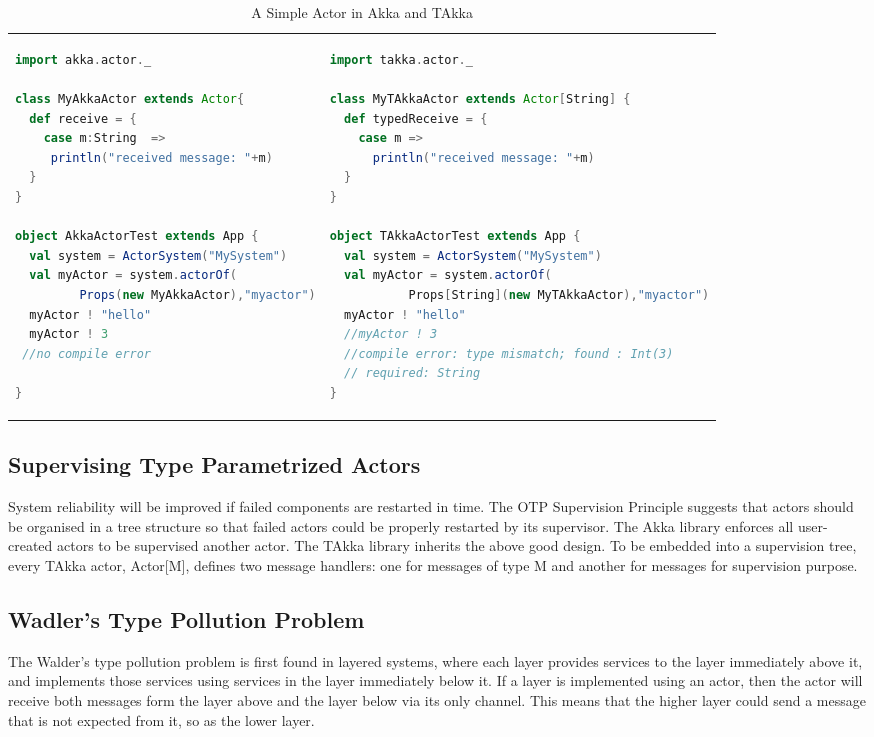 \begin{table}[h]
\label{first_actor}
  \begin{adjustwidth}{-0.5cm}{}
  \begin{tabular}{ l l }
      \begin{lstlisting}[language=scala]
import akka.actor._

class MyAkkaActor extends Actor{
  def receive = {
    case m:String  =>
     println("received message: "+m)
  }
}

object AkkaActorTest extends App {
  val system = ActorSystem("MySystem")
  val myActor = system.actorOf(
         Props(new MyAkkaActor),"myactor")
  myActor ! "hello"
  myActor ! 3
 //no compile error

}
      \end{lstlisting}
&
      \begin{lstlisting}[language=scala]
import takka.actor._

class MyTAkkaActor extends Actor[String] {
  def typedReceive = {
    case m =>
      println("received message: "+m)
  }
}

object TAkkaActorTest extends App {
  val system = ActorSystem("MySystem")
  val myActor = system.actorOf(
           Props[String](new MyTAkkaActor),"myactor")
  myActor ! "hello"
  //myActor ! 3
  //compile error: type mismatch; found : Int(3)
  // required: String
}
      \end{lstlisting}
  \end{tabular}
  \caption{A Simple Actor in Akka and TAkka}
  \end{adjustwidth}
  \label{my_table}
\end{table}


\subsection{Supervising Type Parametrized Actors}
System reliability will be improved if failed components are restarted in time. The OTP Supervision Principle suggests that actors should be organised in a tree structure so that failed actors could be properly restarted by its supervisor.  The Akka library enforces all user-created actors to be supervised another actor.  The TAkka library inherits the above good design.  To be embedded into a supervision tree, every TAkka actor, Actor[M], defines two message handlers: one for messages of type M and another for messages for supervision purpose.

\subsection{Wadler\rq{}s Type Pollution Problem}
The Walder\rq{}s type pollution problem is first found in layered systems, where each layer provides services to the layer immediately above it, and implements those services using services in the layer immediately below it.  If a layer is implemented using an actor, then the actor will receive both messages form the layer above and the layer below via its only channel. This means that the higher layer could send a message that is not expected from it, so as the lower layer. 

